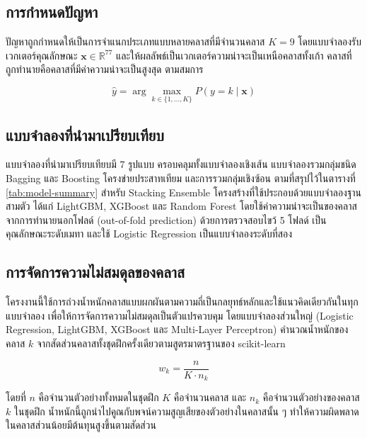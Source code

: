 \subsection{การกำหนดปัญหา}

ปัญหาถูกกำหนดให้เป็นการจำแนกประเภทแบบหลายคลาสที่มีจำนวนคลาส $K = 9$ โดยแบบจำลองรับเวกเตอร์คุณลักษณะ $\mathbf{x} \in \mathbb{R}^{77}$ และให้ผลลัพธ์เป็นเวกเตอร์ความน่าจะเป็นเหนือคลาสทั้งเก้า คลาสที่ถูกทำนายคือคลาสที่มีค่าความน่าจะเป็นสูงสุด ตามสมการ

\begin{equation}
    \hat{y} = \arg\max_{k \in \{1, \ldots, K\}} P(y = k \mid \mathbf{x})
\end{equation}

\subsection{แบบจำลองที่นำมาเปรียบเทียบ}

แบบจำลองที่นำมาเปรียบเทียบมี 7 รูปแบบ ครอบคลุมทั้งแบบจำลองเชิงเส้น แบบจำลองรวมกลุ่มชนิด Bagging และ Boosting โครงข่ายประสาทเทียม และการรวมกลุ่มเชิงซ้อน ตามที่สรุปไว้ในตารางที่ \ref{tab:model-summary} สำหรับ Stacking Ensemble โครงสร้างที่ใช้ประกอบด้วยแบบจำลองฐานสามตัว ได้แก่ LightGBM, XGBoost และ Random Forest โดยใช้ค่าความน่าจะเป็นของคลาสจากการทำนายนอกโฟลด์ (out-of-fold prediction) ด้วยการตรวจสอบไขว้ 5 โฟลด์ เป็นคุณลักษณะระดับเมทา และใช้ Logistic Regression เป็นแบบจำลองระดับที่สอง \cite{wolpert1992stacked, ting1999issues}

\subsection{การจัดการความไม่สมดุลของคลาส}

โครงงานนี้ใช้การถ่วงน้ำหนักคลาสแบบผกผันตามความถี่เป็นกลยุทธ์หลักและใช้แนวคิดเดียวกันในทุกแบบจำลอง เพื่อให้การจัดการความไม่สมดุลเป็นตัวแปรควบคุม โดยแบบจำลองส่วนใหญ่ (Logistic Regression, LightGBM, XGBoost และ Multi-Layer Perceptron) คำนวณน้ำหนักของคลาส $k$ จากสัดส่วนคลาสทั้งชุดฝึกครั้งเดียวตามสูตรมาตรฐานของ scikit-learn

\begin{equation}
    w_{k} = \frac{n}{K \cdot n_{k}}
\end{equation}

โดยที่ $n$ คือจำนวนตัวอย่างทั้งหมดในชุดฝึก $K$ คือจำนวนคลาส และ $n_{k}$ คือจำนวนตัวอย่างของคลาส $k$ ในชุดฝึก น้ำหนักนี้ถูกนำไปคูณกับพจน์ความสูญเสียของตัวอย่างในคลาสนั้น ๆ ทำให้ความผิดพลาดในคลาสส่วนน้อยมีต้นทุนสูงขึ้นตามสัดส่วน

